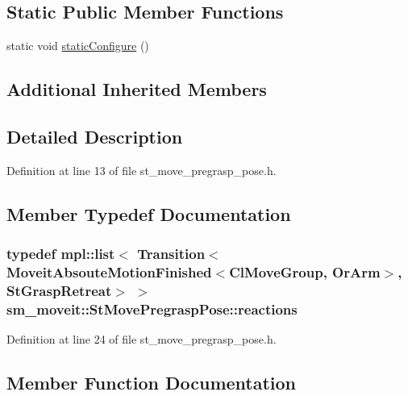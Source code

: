 \subsection*{Static Public Member Functions}
\begin{DoxyCompactItemize}
\item 
static void \hyperlink{structsm__moveit_1_1StMovePregraspPose_abba2d64923acfa33d163978e64dd04d7}{static\+Configure} ()
\end{DoxyCompactItemize}
\subsection*{Additional Inherited Members}


\subsection{Detailed Description}


Definition at line 13 of file st\+\_\+move\+\_\+pregrasp\+\_\+pose.\+h.



\subsection{Member Typedef Documentation}
\subsubsection[{\texorpdfstring{reactions}{reactions}}]{\setlength{\rightskip}{0pt plus 5cm}typedef mpl\+::list$<$ Transition$<${\bf Moveit\+Absoute\+Motion\+Finished}$<${\bf Cl\+Move\+Group}, {\bf Or\+Arm}$>$, {\bf St\+Grasp\+Retreat}$>$ $>$ {\bf sm\+\_\+moveit\+::\+St\+Move\+Pregrasp\+Pose\+::reactions}}\hypertarget{structsm__moveit_1_1StMovePregraspPose_ac0b49ce81fdbf86ad8c0fbc35dbd3c41}{}\label{structsm__moveit_1_1StMovePregraspPose_ac0b49ce81fdbf86ad8c0fbc35dbd3c41}


Definition at line 24 of file st\+\_\+move\+\_\+pregrasp\+\_\+pose.\+h.



\subsection{Member Function Documentation}
